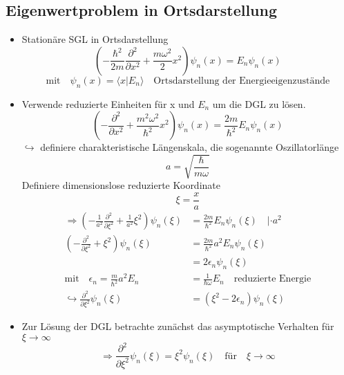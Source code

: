 \documentclass[10pt,article,colorback,accentcolor=tud9d]{scrartcl}
\begin{document}
\subsection{Eigenwertproblem in Ortsdarstellung}
\begin{itemize}
	\item Stationäre SGL in Ortsdarstellung
    \begin{equation}
    \left(-\frac{\hbar^2}{2m}\frac{\partial^2}{\partial x^2}+\frac{m\omega^2}{2}x^2\right)\psi_n(x)=E_n\psi_n(x)
    \end{equation}
    \begin{equation}
    \text{mit}\quad\psi_n(x)=\langle x|E_n\rangle \quad \text{Ortsdarstellung der Energieeigenzustände}
    \end{equation}
  \item Verwende reduzierte Einheiten für x und $E_n$ um die DGL zu lösen.
    \begin{equation}
    \left(-\frac{\partial^2}{\partial x^2}+\frac{m^2\omega^2}{\hbar^2}x^2\right)\psi_n(x)=\frac{2m}{\hbar^2}E_n\psi_n(x)
    \end{equation}
    $\hookrightarrow$ definiere charakteristische Längenskala, die sogenannte Oszillatorlänge
    \begin{equation}
    a=\sqrt{\frac{\hbar}{m\omega}}
    \end{equation}
    Definiere dimensionslose reduzierte Koordinate 
    \begin{equation}
    \xi=\frac{x}{a}
    \end{equation}
    \begin{align}
    \Rightarrow\left(-\frac{1}{a^2}\frac{\partial^2}{\partial\xi^2}+\frac{1}{a^2}\xi^2\right)\psi_n(\xi)&=\frac{2m}{\hbar^2}E_n\psi_n(\xi)\quad |\cdot a^2\\
    \left(-\frac{\partial^2}{\partial\xi^2}+\xi^2\right)\psi_n(\xi)&=\frac{2m}{\hbar^2}a^2E_n\psi_n(\xi)\\
    &=2\epsilon_n\psi_n(\xi)\\
    \text{mit}\quad \epsilon_n=\frac{m}{\hbar^2}a^2E_n&=\frac{1}{\hbar \omega}E_n \quad \text{reduzierte Energie}\\
    \hookrightarrow \frac{\partial^2}{\partial\xi^2}\psi_n(\xi)&=(\xi^2-2\epsilon_n)\psi_n(\xi)
    \end{align}
  \item Zur Lösung der DGL betrachte zunächst das asymptotische Verhalten für $\xi\rightarrow\infty$
    \begin{equation}
    \Rightarrow \frac{\partial^2}{\partial\xi^2}\psi_n(\xi)=\xi^2\psi_n(\xi) \quad \text{für}\quad \xi\rightarrow\infty

\end{equation}
\end{itemize}
\end{document}
